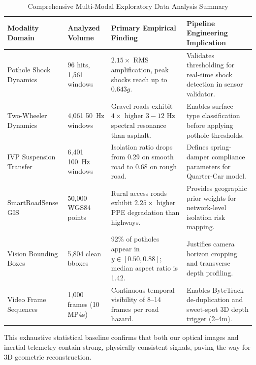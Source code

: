 \begin{table}[htbp]
\centering
\small
\caption{Comprehensive Multi-Modal Exploratory Data Analysis Summary}
\label{tab:eda_summary}
\begin{tabularx}{\textwidth}{llp{3.8cm}X}
\toprule
\textbf{Modality Domain} & \textbf{Analyzed Volume} & \textbf{Primary Empirical Finding} & \textbf{Pipeline Engineering Implication} \\
\midrule
Pothole Shock Dynamics & 96 hits, 1,561 windows & $2.15\times$ RMS amplification, peak shocks reach up to $0.643g$. & Validates thresholding for real-time shock detection in sensor validator. \\
Two-Wheeler Dynamics & 4,061 50~Hz windows & Gravel roads exhibit $4\times$ higher $3-12\text{ Hz}$ spectral resonance than asphalt. & Enables surface-type classification before applying pothole thresholds. \\
IVP Suspension Transfer & 6,401 100~Hz windows & Isolation ratio drops from 0.29 on smooth road to 0.68 on rough road. & Defines spring-damper compliance parameters for Quarter-Car model. \\
SmartRoadSense GIS & 50,000 WGS84 points & Rural access roads exhibit $2.25\times$ higher PPE degradation than highways. & Provides geographic prior weights for network-level isolation risk mapping. \\
Vision Bounding Boxes & 5,804 clean bboxes & 92\% of potholes appear in $y \in [0.50, 0.88]$; median aspect ratio is 1.42. & Justifies camera horizon cropping and transverse depth profiling. \\
Video Frame Sequences & 1,000 frames (10 MP4s) & Continuous temporal visibility of 8--14 frames per road hazard. & Enables ByteTrack de-duplication and sweet-spot 3D depth trigger (2--4m). \\
\bottomrule
\end{tabularx}
\end{table}

This exhaustive statistical baseline confirms that both our optical images and inertial telemetry contain strong, physically consistent signals, paving the way for 3D geometric reconstruction.
